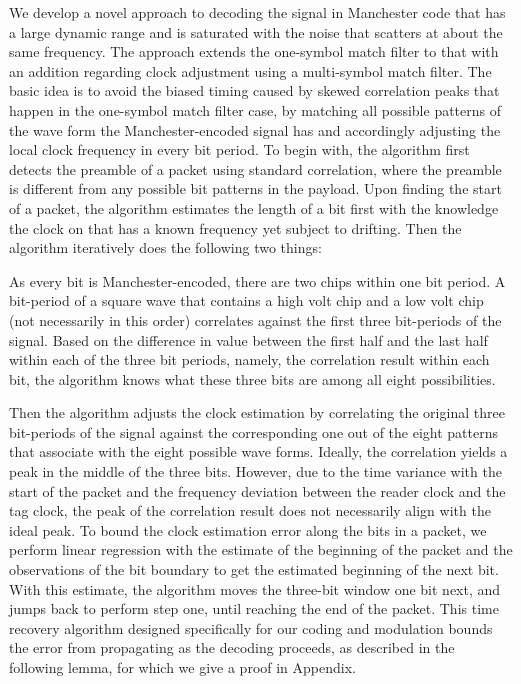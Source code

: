We develop a novel approach to decoding the signal in Manchester code that has a large dynamic range and is saturated with the noise that scatters at about the same frequency. The approach extends the one-symbol match filter to that with an addition regarding clock adjustment using a multi-symbol match filter. The basic idea is to avoid the biased timing caused by skewed correlation peaks that happen in the one-symbol match filter case, by matching all possible patterns of the wave form the Manchester-encoded signal has and accordingly adjusting the local clock frequency in every bit period. To begin with, the algorithm first detects the preamble of a packet using standard correlation, where the preamble is different from any possible bit patterns in the payload. Upon finding the start of a packet, the algorithm estimates the length of a bit first with the knowledge the clock on \vitag that has a known frequency yet subject to drifting. Then the algorithm iteratively does the following two things:
\begin{Itemize} 
\item As every bit is Manchester-encoded, there are two chips within one bit period. A bit-period of a square wave that contains a high volt chip and a low volt chip (not necessarily in this order) correlates against the first three bit-periods of the signal. Based on the difference in value between the first half and the last half within each of the three bit periods, namely, the correlation result within each bit, the algorithm knows what these three bits are among all eight possibilities.
\item Then the algorithm adjusts the clock estimation by correlating the original three bit-periods of the signal against the corresponding one out of the eight patterns that associate with the eight possible wave forms. Ideally, the correlation yields a peak in the middle of the three bits. However, due to the time variance with the start of the packet and the frequency deviation between the reader clock and the tag clock, the peak of the correlation result does not necessarily align with the ideal peak. To bound the clock estimation error along the bits in a packet, we perform linear regression with the estimate of the beginning of the packet and the observations of the bit boundary to get the  estimated beginning of the next bit. With this estimate, the algorithm moves the three-bit window one bit next, and jumps back to perform step one, until reaching the end of the packet. This time recovery algorithm designed specifically for our coding and modulation bounds the error from propagating as the decoding proceeds, as described in the following lemma, for which we give a proof in Appendix.
\end{Itemize}

